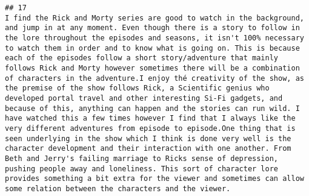 \documentclass[
]{article}
\begin{document}
\begin{verbatim}
## 17                                                                                                                                                                                                                                                                                                                                                                                                                                                                                                                                                                                                                                                                                                                                                                                                                                                                                                                                                                                                                                                                                                                                                                                                       I find the Rick and Morty series are good to watch in the background, and jump in at any moment. Even though there is a story to follow in the lore throughout the episodes and seasons, it isn't 100% necessary to watch them in order and to know what is going on. This is because each of the episodes follow a short story/adventure that mainly follows Rick and Morty however sometimes there will be a combination of characters in the adventure.I enjoy thé creativity of the show, as the premise of the show follows Rick, a Scientific genius who developed portal travel and other interesting Si-Fi gadgets, and because of this, anything can happen and the stories can run wild. I have watched this a few times however I find that I always like the very different adventures from episode to episode.One thing that is seen underlying in the show which I think is done very well is the character development and their interaction with one another. From Beth and Jerry's failing marriage to Ricks sense of depression, pushing people away and loneliness. This sort of character lore provides something a bit extra for the viewer and sometimes can allow some relation between the characters and the viewer.

\end{verbatim}
\end{document}
